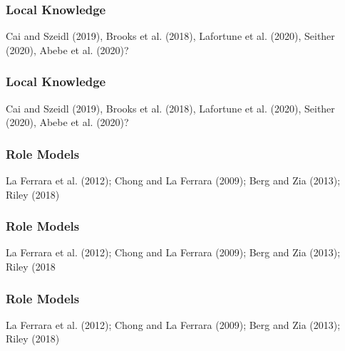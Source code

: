 \documentclass[hideothersubsections, usenames,dvipsnames,10pt]{beamer}
\newenvironment{itemize_3pt}{\itemize\addtolength{\itemsep}{3pt}}{\enditemize}
\begin{document}
\begin{frame}
\frametitle{Local Knowledge}
	\begin{itemize_3pt}
	\item Cai and Szeidl (2019), Brooks et al. (2018), Lafortune et al. (2020), Seither (2020), Abebe et al. (2020)?
	\vspace{0.1in}
	\end{itemize_3pt}
\end{frame}

\begin{frame}
\frametitle{Local Knowledge}
	\begin{itemize_3pt}
	\item Cai and Szeidl (2019), Brooks et al. (2018), Lafortune et al. (2020), Seither (2020), Abebe et al. (2020)?
	\vspace{0.1in}
	\end{itemize_3pt}
\end{frame}


\begin{frame}
\frametitle{Role Models}
	\begin{itemize_3pt}
	\item  La Ferrara et al. (2012); Chong and La Ferrara (2009); Berg and Zia (2013); Riley (2018)
	\vspace{0.1in}
	\end{itemize_3pt}
\end{frame}

\begin{frame}
\frametitle{Role Models}
	\begin{itemize_3pt}
	\item  La Ferrara et al. (2012); Chong and La Ferrara (2009); Berg and Zia (2013); Riley (2018
	\vspace{0.1in}
	\end{itemize_3pt}
\end{frame}

\begin{frame}
\frametitle{Role Models}
	\begin{itemize_3pt}
	\item  La Ferrara et al. (2012); Chong and La Ferrara (2009); Berg and Zia (2013); Riley (2018)
	\vspace{0.1in}
	\end{itemize_3pt}
\end{frame}


\end{document}
